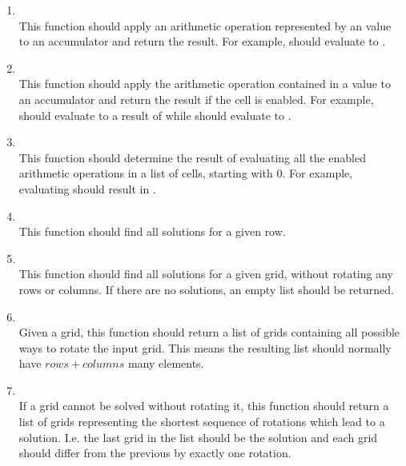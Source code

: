 \begin{enumerate}
	\item {}\\
	This function should apply an arithmetic operation represented by an  value to an accumulator and return the result. For example,  should evaluate to .
	
	\item {}\\
	This function should apply the arithmetic operation contained in a  value to an accumulator and return the result if the cell is enabled. For example,  should evaluate to a result of  while \linebreak {} should evaluate to .
	
	\item {}\\
	This function should determine the result of evaluating all the enabled arithmetic operations in a list of cells, starting with $0$. For example, evaluating  should result in .
	
	\item {}\\
	This function should find all solutions for a given row.
	
	\item {}\\
	This function should find all solutions for a given grid, without rotating any rows or columns. If there are no solutions, an empty list should be returned.
	
	\item {}\\
	Given a grid, this function should return a list of grids containing all possible ways to rotate the input grid. This means the resulting list should normally have $\mathit{rows} + \mathit{columns}$ many elements.
	
	\item {}\\
	If a grid cannot be solved without rotating it, this function should return a list of grids representing the shortest sequence of rotations which lead to a solution. I.e. the last grid in the list should be the solution and each grid should differ from the previous by exactly one rotation.
\end{enumerate}

